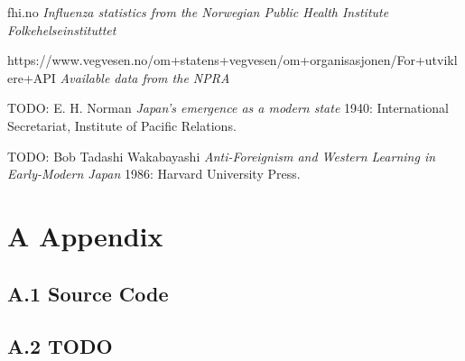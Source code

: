 \documentclass[11pt]{report}
\begin{document}
\begin{thebibliography}{1}

 fhi.no {\em Influenza statistics from the Norwegian Public Health Institute 		Folkehelseinstituttet}

 https://www.vegvesen.no/om+statens+vegvesen/om+organisasjonen/For+utviklere+API {\em Available data from the NPRA}

 TODO: E. H. Norman {\em Japan's emergence as a modern state} 1940: International Secretariat, Institute of Pacific Relations.

 TODO: Bob Tadashi Wakabayashi {\em Anti-Foreignism and Western Learning in Early-Modern Japan} 1986: Harvard University Press.

\end{thebibliography}

\chapter*{\vspace{-3cm}A Appendix}

\section*{A.1 Source Code}

\section*{A.2 TODO}
\end{document}
